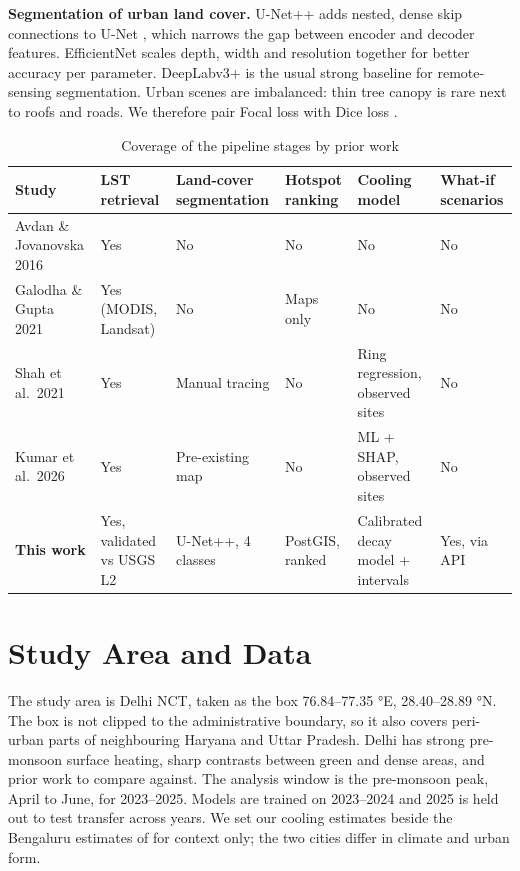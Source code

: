 \documentclass[conference]{IEEEtran}
\begin{document}
\textbf{Segmentation of urban land cover.} U-Net++ \cite{b6} adds
nested, dense skip connections to U-Net \cite{b9}, which narrows the gap
between encoder and decoder features. EfficientNet \cite{b7} scales
depth, width and resolution together for better accuracy per parameter.
DeepLabv3+ \cite{b8} is the usual strong baseline for remote-sensing
segmentation. Urban scenes are imbalanced: thin tree canopy is rare next
to roofs and roads. We therefore pair Focal loss \cite{b10} with Dice
loss \cite{b11}.

\begin{table}[!t]
\centering\footnotesize
\caption{Coverage of the pipeline stages by prior work}
\label{tab:1}
\renewcommand{\arraystretch}{1.15}
\begin{tabularx}{\textwidth}{>{\raggedright\arraybackslash}X>{\raggedright\arraybackslash}X>{\raggedright\arraybackslash}X>{\raggedright\arraybackslash}X>{\raggedright\arraybackslash}X>{\raggedright\arraybackslash}X}
\toprule
\textbf{Study} & \textbf{LST retrieval} & \textbf{Land-cover segmentation} & \textbf{Hotspot ranking} & \textbf{Cooling model} & \textbf{What-if scenarios} \\
\midrule
Avdan \& Jovanovska 2016 \cite{b1} & Yes & No & No & No & No \\
Galodha \& Gupta 2021 \cite{b2} & Yes (MODIS, Landsat) & No & Maps only & No & No \\
Shah et al.~2021 \cite{b3} & Yes & Manual tracing & No & Ring regression, observed sites & No \\
Kumar et al.~2026 \cite{b4} & Yes & Pre-existing map & No & ML + SHAP, observed sites & No \\
\textbf{This work} & Yes, validated vs USGS L2 & U-Net++, 4 classes & PostGIS, ranked & Calibrated decay model + intervals & Yes, via API \\
\bottomrule
\end{tabularx}
\end{table}

\section{Study Area and Data}\label{study-area-and-data}

The study area is Delhi NCT, taken as the box 76.84--77.35 °E,
28.40--28.89 °N. The box is not clipped to the administrative boundary,
so it also covers peri-urban parts of neighbouring Haryana and Uttar
Pradesh. Delhi has strong pre-monsoon surface heating, sharp contrasts
between green and dense areas, and prior work \cite{b2,b4} to compare
against. The analysis window is the pre-monsoon peak, April to June, for
2023--2025. Models are trained on 2023--2024 and 2025 is held out to
test transfer across years. We set our cooling estimates beside the
Bengaluru estimates of \cite{b3} for context only; the two cities differ
in climate and urban form.
\end{document}
